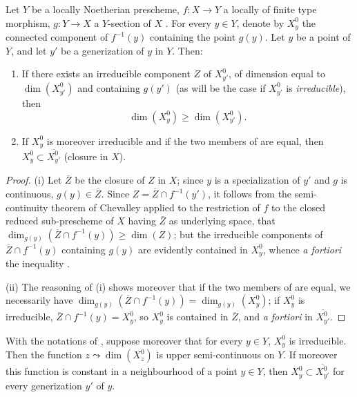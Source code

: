 \begin{proposition}[15.6.1]
\label{IV.15.6.1}
Let $Y$ be a locally Noetherian prescheme, $f:X\to Y$ a locally of finite type morphism, $g:Y\to X$ a $Y$-section of $X$ .
For every $y\in Y$, denote by $X_y^0$ the connected component of $f^{-1}(y)$ containing the point $g(y)$.
Let $y$ be a point of $Y$, and let $y'$ be a generization of $y$ in $Y$.
Then:
\begin{enumerate}[label=(\roman*)]
  \item If there exists an irreducible component $Z$ of $X_{y'}^0$, of dimension equal to $\dim(X_{y'}^0)$ and containing $g(y')$ \textup{(as will be the case if $X_{y'}^0$ is \emph{irreducible})}, then
\begin{equation}
\tag{15.6.1.1}
\label{IV.15.6.1.1}
  \dim(X_y^0) \geq \dim(X_{y'}^0).
\end{equation}
  \item If $X_y^0$ is moreover irreducible and if the two members of  are equal, then $X_y^0\subset\overline{X_{y'}^0}$ (closure in $X$).
\end{enumerate}
\end{proposition}

\begin{proof}
(i)
Let $\overline{Z}$ be the closure of $Z$ in $X$; since $y$ is a specialization of $y'$ and $g$ is continuous, $g(y)\in\overline{Z}$.
Since $Z=\overline{Z}\cap f^{-1}(y')$, it follows from the semi-continuity theorem of Chevalley  applied to the restriction of $f$ to the closed reduced sub-prescheme of $X$ having $\overline{Z}$ as underlying space, that $\dim_{g(y)}(\overline{Z}\cap f^{-1}(y))\geq\dim(Z)$; but the irreducible components of $\overline{Z}\cap f^{-1}(y)$ containing $g(y)$ are evidently contained in $X_y^0$, whence \emph{a fortiori} the inequality .

(ii)
The reasoning of (i) shows moreover that if the two members of  are equal, we necessarily have $\dim_{g(y)}(\overline{Z}\cap f^{-1}(y))=\dim_{g(y)}(X_y^0)$; if $X_y^0$ is irreducible, $\overline{Z}\cap f^{-1}(y)=X_y^0$, so $X_y^0$ is contained in $\overline{Z}$, and \emph{a fortiori} in $\overline{X_{y'}^0}$.
\end{proof}

\begin{corollary}[15.6.2]
\label{IV.15.6.2}
With the notations of , suppose moreover that for every $y\in Y$, $X_y^0$ is irreducible.
Then the function $z\leadsto\dim(X_z^0)$ is upper semi-continuous on $Y$.
If moreover this function is constant in a neighbourhood of a point $y\in Y$, then $X_y^0\subset\overline{X_{y'}^0}$ for every generization $y'$ of $y$.
\end{corollary}

